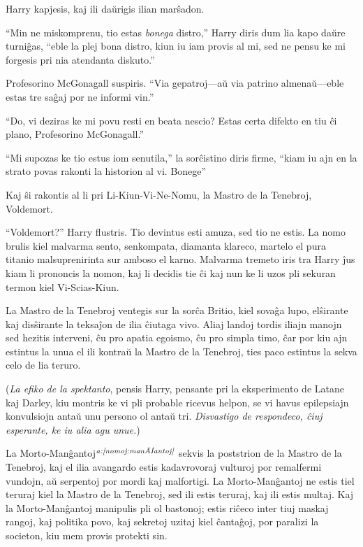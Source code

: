 Harry kapjesis, kaj ili daŭrigis ilian marŝadon.

``Min ne miskomprenu, tio estas \emph{bonega} distro,'' Harry diris
dum lia kapo daŭre turniĝas, ``eble la plej bona distro, kiun iu iam
provis al mi, sed ne pensu ke mi forgesis pri nia atendanta diskuto.''

Profesorino McGonagall suspiris. ``Via gepatroj—aŭ via patrino
almenaŭ—eble estas tre saĝaj por ne informi vin.''

``Do, vi deziras ke mi povu resti en beata nescio? Estas certa
difekto en tiu ĉi plano, Profesorino McGonagall.''

``Mi supozas ke tio estus iom senutila,'' la sorĉistino diris firme,
``kiam iu ajn en la strato povas rakonti la historion al vi. Bonege''

Kaj ŝi rakontis al li pri Li-Kiun-Vi-Ne-Nomu, la Mastro de la
Tenebroj, Voldemort.

``Voldemort?'' Harry flustris. Tio devintus esti amuza, sed tio ne
estis. La nomo brulis kiel malvarma sento, senkompata, diamanta
klareco, martelo el pura titanio malsuprenirinta sur amboso el
karno. Malvarma tremeto iris tra Harry ĵus kiam li prononcis la nomon,
kaj li decidis tie ĉi kaj nun ke li uzos pli sekuran termon kiel
Vi-Scias-Kiun.

La Mastro de la Tenebroj ventegis sur la sorĉa Britio, kiel sovaĝa
lupo, elŝirante kaj disŝirante la teksaĵon de ilia ĉiutaga vivo. Aliaj
landoj tordis iliajn manojn sed hezitis interveni, ĉu pro apatia
egoismo, ĉu pro simpla timo, ĉar por kiu ajn estintus la unua el ili
kontraŭ la Mastro de la Tenebroj, ties paco estintus la sekva celo de
lia teruro.

(\emph{La efiko de la spektanto}, pensis Harry, pensante pri la
eksperimento de Latane kaj Darley, kiu montris ke vi pli probable
ricevus helpon, se vi havus epilepsiajn konvulsiojn antaŭ unu persono
ol antaŭ tri. \emph {Disvastigo de respondeco, ĉiuj esperante, ke iu
alia agu unue.})

La Morto-Manĝantoj$^{\textit{a:\ref{nomoj:manĝantoj}}}$ sekvis la poststrion de la
Mastro de la Tenebroj, kaj el ilia avangardo estis kadavrovoraj
vulturoj por remalfermi vundojn, aŭ serpentoj por mordi kaj
malfortigi. La Morto-Manĝantoj ne estis tiel teruraj kiel la Mastro de
la Tenebroj, sed ili estis teruraj, kaj ili estis multaj.  Kaj la
Morto-Manĝantoj manipulis pli ol bastonoj; estis riĉeco inter tiuj
maskaj rangoj, kaj politika povo, kaj sekretoj uzitaj kiel ĉantaĝoj,
por paralizi la societon, kiu mem provis protekti sin.

